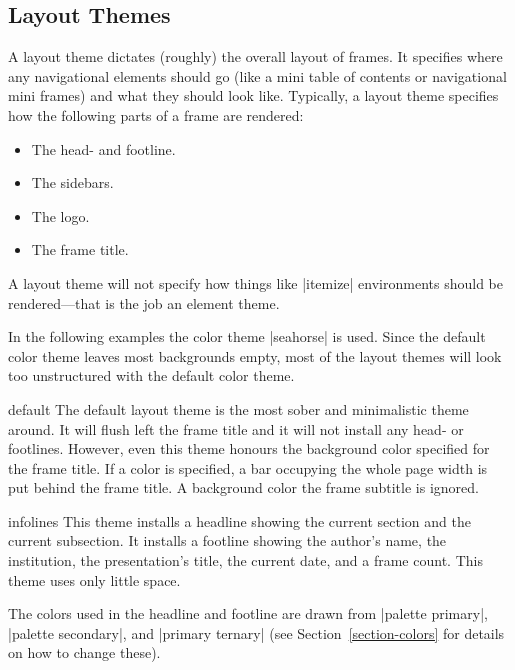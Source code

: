 \subsection{Layout Themes}

A layout theme dictates (roughly) the overall layout of frames. It
specifies where any navigational elements should go (like a mini table
of contents or navigational mini frames) and what they should look
like. Typically, a layout theme specifies how the following parts of a
frame are rendered:
\begin{itemize}
\item The head- and footline.
\item The sidebars.
\item The logo.
\item The frame title.  
\end{itemize}

A layout theme will not specify how things like |itemize| environments
should be rendered---that is the job an element theme.

In the following examples the color theme |seahorse| is
used. Since the default color theme leaves most backgrounds empty,
most of the layout themes will look too unstructured with the default
color theme. 


\begin{layoutthemeexample}{default}
  The default layout theme is the most sober and minimalistic theme
  around. It will flush left the frame title and it will not install
  any head- or footlines. However, even this theme honours the
  background color specified for the frame title. If a color is
  specified, a bar occupying the whole page width is put behind the
  frame title. A background color the frame subtitle is ignored.
\end{layoutthemeexample}

\begin{layoutthemeexample}{infolines}
  This theme installs a headline showing the current section and the
  current subsection. It installs a footline showing the author's
  name, the institution, the presentation's title, the current date,
  and a frame count. This theme uses only little space.

  The colors used in the headline and footline are drawn from
  |palette primary|, |palette secondary|, and |primary ternary| (see
  Section~\ref{section-colors} for details on how to change these).
\end{layoutthemeexample}

